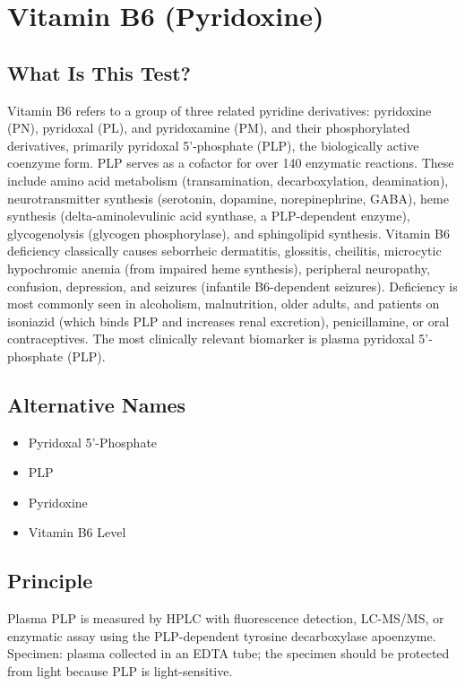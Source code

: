 \chapter{Vitamin B6 (Pyridoxine)}
\section*{What Is This Test?}
Vitamin B6 refers to a group of three related pyridine derivatives: pyridoxine (PN), pyridoxal (PL), and pyridoxamine (PM), and their phosphorylated derivatives, primarily pyridoxal 5'-phosphate (PLP), the biologically active coenzyme form. PLP serves as a cofactor for over 140 enzymatic reactions. These include amino acid metabolism (transamination, decarboxylation, deamination), neurotransmitter synthesis (serotonin, dopamine, norepinephrine, GABA), heme synthesis (delta-aminolevulinic acid synthase, a PLP-dependent enzyme), glycogenolysis (glycogen phosphorylase), and sphingolipid synthesis. Vitamin B6 deficiency classically causes seborrheic dermatitis, glossitis, cheilitis, microcytic hypochromic anemia (from impaired heme synthesis), peripheral neuropathy, confusion, depression, and seizures (infantile B6-dependent seizures). Deficiency is most commonly seen in alcoholism, malnutrition, older adults, and patients on isoniazid (which binds PLP and increases renal excretion), penicillamine, or oral contraceptives. The most clinically relevant biomarker is plasma pyridoxal 5'-phosphate (PLP).
\section*{Alternative Names}
\begin{itemize}
  \item Pyridoxal 5'-Phosphate
  \item PLP
  \item Pyridoxine
  \item Vitamin B6 Level
\end{itemize}
\section*{Principle}
Plasma PLP is measured by HPLC with fluorescence detection, LC-MS/MS, or enzymatic assay using the PLP-dependent tyrosine decarboxylase apoenzyme. Specimen: plasma collected in an EDTA tube; the specimen should be protected from light because PLP is light-sensitive.

